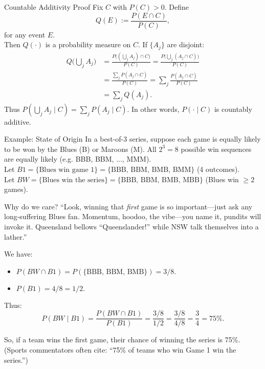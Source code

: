 \documentclass[aspectratio=169,11pt]{beamer} %
\begin{document}
\begin{frame}{Countable Additivity Proof}
\small
Fix $C$ with $P(C)>0$. Define 
\[ Q(E) := \frac{P(E \cap C)}{P(C)}, \] 
for any event $E$. \\[1ex] 
Then $Q(\cdot)$ is a probability measure on $C$. If $\{A_j\}$ are disjoint:
\begin{align*}
Q\Big(\bigcup_j A_j\Big) &= \frac{P\Big((\bigcup_j A_j)\cap C\Big)}{P(C)} 
= \frac{P\big(\bigcup_j (A_j \cap C)\big)}{P(C)} \\
&= \frac{\sum_j P(A_j \cap C)}{P(C)} 
= \sum_j \frac{P(A_j \cap C)}{P(C)} \\
&= \sum_j Q(A_j).
\end{align*}
Thus $P(\bigcup_j A_j \mid C) = \sum_j P(A_j \mid C)$. In other words, $P(\cdot \mid C)$ is countably additive.
\end{frame}

\begin{frame}[fragile]{Example: State of Origin}
\small
In a best-of-3 series, suppose each game is equally likely to be won by the Blues (B) or Maroons (M). All $2^3 = 8$ possible win sequences are equally likely (e.g. BBB, BBM, ..., MMM). \\[1ex]
Let $B1 = \{\text{Blues win game 1}\} = \{\text{BBB, BBM, BMB, BMM}\}$ (4 outcomes). \\
Let $BW = \{\text{Blues win the series}\} = \{\text{BBB, BBM, BMB, MBB}\}$ (Blues win $\ge 2$ games). \\

\begin{alertblock}{Why do we care?}
``Look, winning that \emph{first} game is so important—just ask any long‑suffering Blues fan.
Momentum, hoodoo, the vibe—you name it, pundits will invoke it.
Queensland bellows “Queenslander!” while NSW talk themselves into a lather.''
\end{alertblock}

We have:
\begin{itemize}
    \item $P(BW \cap B1) = P(\{\text{BBB, BBM, BMB}\}) = 3/8.$ 
    \item $P(B1) = 4/8 = 1/2.$ 
\end{itemize}
Thus:
\[ P(BW \mid B1) = \frac{P(BW \cap B1)}{P(B1)} = \frac{3/8}{1/2} = \frac{3/8}{4/8} = \frac{3}{4} = 75\%. \]

So, if a team wins the first game, their chance of winning the series is 75\%. (Sports commentators often cite: ``75\% of teams who win Game 1 win the series.'')
\end{frame}
\end{document}
